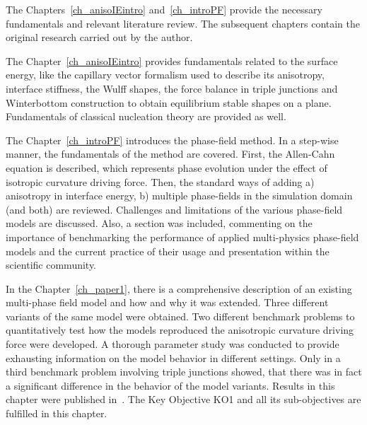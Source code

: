 
The Chapters~\ref{ch_anisoIEintro} and~\ref{ch_introPF} provide the necessary fundamentals and relevant literature review. The subsequent chapters contain the original research carried out by the author.


The Chapter~\ref{ch_anisoIEintro} provides fundamentals related to the surface energy, like the capillary vector formalism used to describe its anisotropy, interface stiffness, the Wulff shapes, the force balance in triple junctions and Winterbottom construction to obtain equilibrium stable shapes on a plane. Fundamentals of classical nucleation theory are provided as well.

The Chapter~\ref{ch_introPF} introduces the phase-field method. In a step-wise manner, the fundamentals of the method are covered. First, the Allen-Cahn equation is described, which represents phase evolution under the effect of isotropic curvature driving force. Then, the standard ways of adding a) anisotropy in interface energy, b) multiple phase-fields in the simulation domain (and both) are reviewed. Challenges and limitations of the various phase-field models are discussed. Also, a section was included, commenting on the importance of benchmarking the performance of applied multi-physics phase-field models and the current practice of their usage and presentation within the scientific community.

In the Chapter~\ref{ch_paper1}, there is a comprehensive description of an existing multi-phase field model and how and why it was extended. Three different variants of the same model were obtained. Two different benchmark problems to quantitatively test how the models reproduced the anisotropic curvature driving force were developed. A thorough parameter study was conducted to provide exhausting information on the model behavior in different settings. Only in a third benchmark problem involving triple junctions showed, that there was in fact a significant difference in the behavior of the model variants. Results in this chapter were published in~\cite{Minar2022}. The Key Objective KO1 and all its sub-objectives are fulfilled in this chapter.

